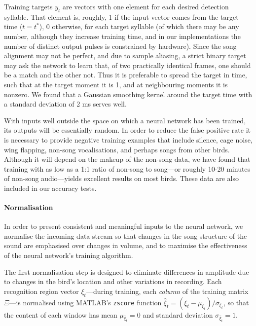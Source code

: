 \documentclass[10pt,letterpaper]{article}
\renewcommand{\subsubsection}[1]{\paragraph{#1}}
\begin{document}
Training targets $y_t$ are vectors with one element for each desired
detection syllable.  That element is, roughly, 1 if the input vector
comes from the target time ($t=t^*$), 0 otherwise, for each target
syllable (of which there may be any number, although they increase
training time, and in our implementations the number of distinct
output pulses is constrained by hardware).  Since the song alignment
may not be perfect, and due to sample aliasing, a
strict binary target may ask the network to learn that, of two
practically identical frames, one should be a match and the other
not. Thus it is preferable to spread the target in time, such that at
the target moment it is 1, and at neighbouring moments it is
nonzero. We found that a Gaussian smoothing kernel around the target
time with a standard deviation of 2 ms serves well.

With inputs well outside the space on which a neural network has been
trained, its outputs will be essentially random. In order to reduce
the false positive rate it is necessary to provide negative training
examples that include silence, cage noise, wing flapping, non-song
vocalisations, and perhaps songs from other birds.  Although it will
depend on the makeup of the non-song data, we have found that training
with as low as a 1:1 ratio of non-song to song---or roughly 10-20
minutes of non-song audio---yields excellent results on most birds.
These data are also included in our accuracy tests.


\subsubsection{Normalisation}

In order to present consistent and meaningful inputs to the neural
network, we normalise the incoming data stream so that changes in the
song structure of the sound are emphasised over changes in volume, and
to maximise the effectiveness of the neural network's training
algorithm.

The first normalisation step is designed to eliminate differences in
amplitude due to changes in the bird's location and other variations
in recording.  Each recognition region vector $\xi_t$---during
training, each {\em column} of the training matrix $\Xi$---is
normalised using MATLAB's {\tt zscore} function $\hat{\xi}_t = (\xi_t
- \mu_{\xi_t}) / \sigma_{\xi_t}$, so that the content of each window
has mean $\mu_{\hat{\xi}_t}=0$ and standard deviation
$\sigma_{\hat{\xi}_t}=1$.
\end{document}
